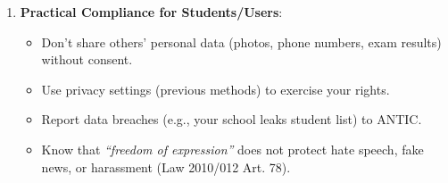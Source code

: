 \documentclass[11pt]{article}
\begin{document}
\begin{methode}
\begin{enumerate}
\begin{itemize}
              \item \textbf{Breach Notification}: Controller must notify ANTIC and affected subjects within \textbf{72 hours} of discovering a breach (Art. 33 GDPR-style, now in Cameroon law).
          \end{itemize}
    \item \textbf{Practical Compliance for Students/Users}:
          \begin{itemize}
              \item Don't share others' personal data (photos, phone numbers, exam results) without consent.
              \item Use privacy settings (previous methods) to exercise your rights.
              \item Report data breaches (e.g., your school leaks student list) to ANTIC.
              \item Know that \textit{``freedom of expression''} does not protect hate speech, fake news, or harassment (Law 2010/012 Art. 78).
          \end{itemize}
\end{enumerate}
\end{methode}
\end{document}
